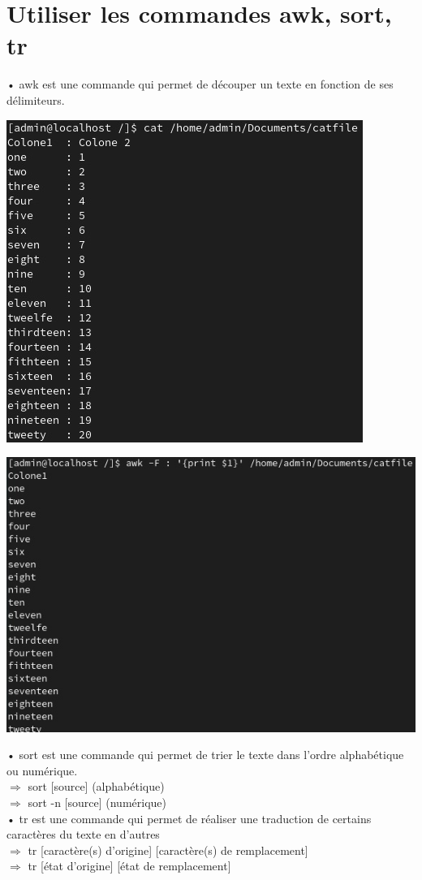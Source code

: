 \documentclass[a4paper, 11pt, french, oneside]{book}
\begin{document}
		\section{Utiliser les commandes awk, sort, tr} 
		    • awk est une commande qui permet de découper un texte en fonction de ses délimiteurs.
			\begin{flushleft}
				\includegraphics{AWK1.jpg}
			\end{flushleft}
			\begin{flushleft}
				\includegraphics{AWK2.jpg}
			\end{flushleft}
			• sort est une commande qui permet de trier le texte dans l’ordre alphabétique ou numérique.\\
			$\Rightarrow$ sort [source] (alphabétique)\\
			$\Rightarrow$ sort -n [source] (numérique)\\
			• tr est une commande qui permet de réaliser une traduction de certains caractères du texte en d’autres\\
			$\Rightarrow$ tr [caractère(s) d’origine] [caractère(s) de remplacement]\\
			$\Rightarrow$ tr [état d’origine] [état de remplacement]
			\pagebreak 
\end{document}
